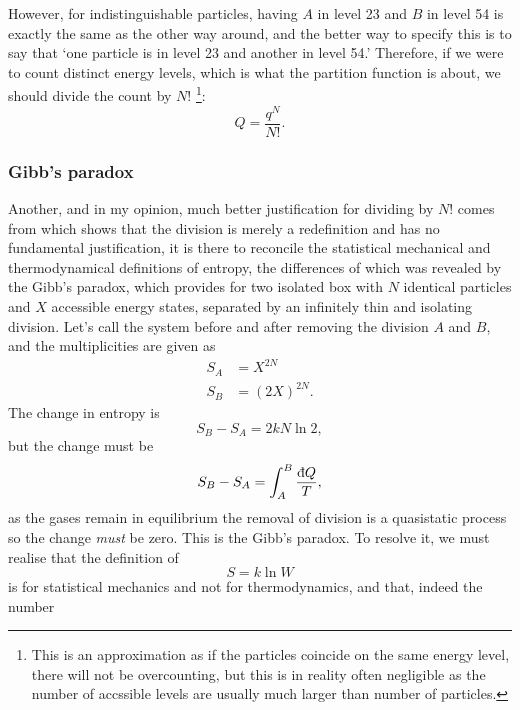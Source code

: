 However, for indistinguishable particles, having $A$ in level 23 and $B$ in level 54 is exactly the same as the other way around, and the better way to specify this 
is to say that `one particle is in level 23 and another in level 54.' 
Therefore, if we were to count distinct energy levels, which is what the partition function is about, 
we should divide the count by $N!$
\footnote{This is an approximation as if the particles coincide on the same energy level, there will not be overcounting, but this is in reality often negligible as the number of accssible levels are usually much larger than number of particles.}:
\begin{equation}
Q=\frac{q^N}{N!}.
\end{equation}


\subsubsection{Gibb's paradox}
Another, and in my opinion, much better justification for dividing by $N!$ comes from \cite{vnd} 
which shows that the division is merely a redefinition and has no 
fundamental justification, it is there to reconcile the statistical mechanical 
and thermodynamical definitions of entropy, the differences of which was revealed 
by the Gibb's paradox, which provides for two isolated box 
with $N$ identical particles and $X$ accessible energy states, separated by an infinitely 
thin and isolating division. Let's call the system before and after removing the division $A$ and $B$, and 
the multiplicities are given as
\begin{subequations}
\begin{align}
S_A&=X^{2N}\\
S_B&=(2X)^{2N}.
\end{align}
\end{subequations}
The change in entropy is 
\begin{equation}
S_B-S_A=2kN\ln 2,
\end{equation}
but the change must be
\begin{equation}
S_B-S_A=\int^B_A \frac{\indiff Q}{T},
\end{equation}
as the gases remain in equilibrium the removal of division is a quasistatic process so the change \textit{must} be zero. 
This is the Gibb's paradox. To resolve it, we must realise that the definition of
\begin{equation}
S=k\ln W
\end{equation}
is for statistical mechanics and not for thermodynamics, and that, indeed the number
